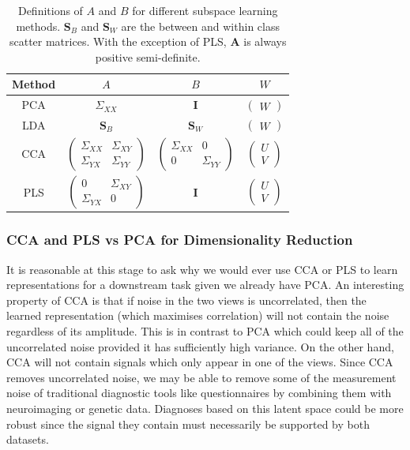 \begin{table}[h] 
\centering 
\begin{tabular}{|c|c|c|c|}
\hline 
Method & $A$ & $B$ & $W$\\ 
\hline 
PCA & $\Sigma_{XX}$ & $\mathbf{I}$ & $\begin{pmatrix}W\end{pmatrix}$\\ 
\hline 
LDA & $\mathbf{S}_B$ & $\mathbf{S}_W$  & $\begin{pmatrix}W\end{pmatrix}$\\
\hline 
CCA & $\begin{pmatrix} \Sigma_{XX} & \Sigma_{XY} \\ \Sigma_{YX} & \Sigma_{YY} \end{pmatrix}$ & $\begin{pmatrix} \Sigma_{XX} & 0 \\ 0 & \Sigma_{YY} \end{pmatrix}$ & $\begin{pmatrix} U \\ V \end{pmatrix}$\\
\hline 
PLS & $\begin{pmatrix} 0 & \Sigma_{XY} \\ \Sigma_{YX} & 0 \end{pmatrix}$ & $\mathbf{I}$ & $\begin{pmatrix} U \\ V \end{pmatrix}$ \\ 
\hline 
\end{tabular} 
\caption{Definitions of $A$ and $B$ for different subspace learning methods. $\mathbf{S}_B$ and $\mathbf{S}_W$ are the between and within class scatter matrices. With the exception of PLS, $\textbf{A}$ is always positive semi-definite.} 
\label{tab:subspace} 
\end{table}

\subsubsection{CCA and PLS vs PCA for Dimensionality Reduction}

It is reasonable at this stage to ask why we would ever use CCA or PLS to learn representations for a downstream task given we already have PCA. An interesting property of CCA is that if noise in the two views is uncorrelated, then the learned representation (which maximises correlation) will not contain the noise regardless of its amplitude. This is in contrast to PCA which could keep all of the uncorrelated noise provided it has sufficiently high variance. On the other hand, CCA will not contain signals which only appear in one of the views. Since CCA removes uncorrelated noise, we may be able to remove some of the measurement noise of traditional diagnostic tools like questionnaires by combining them with neuroimaging or genetic data. Diagnoses based on this latent space could be more robust since the signal they contain must necessarily be supported by both datasets. 


